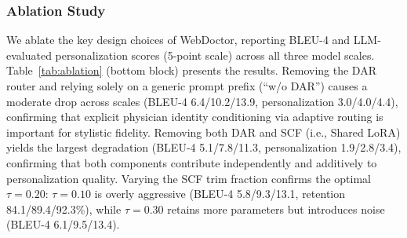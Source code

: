 \subsubsection*{Ablation Study}
We ablate the key design choices of WebDoctor, reporting BLEU-4 and LLM-evaluated personalization scores (5-point scale) across all three model scales.
Table~\ref{tab:ablation} (bottom block) presents the results.
Removing the DAR router and relying solely on a generic prompt prefix (``w/o DAR'') causes a moderate drop across scales (BLEU-4 6.4/10.2/13.9, personalization 3.0/4.0/4.4), confirming that explicit physician identity conditioning via adaptive routing is important for stylistic fidelity.
Removing both DAR and SCF (i.e., Shared LoRA) yields the largest degradation (BLEU-4 5.1/7.8/11.3, personalization 1.9/2.8/3.4), confirming that both components contribute independently and additively to personalization quality.
Varying the SCF trim fraction confirms the optimal $\tau=0.20$: $\tau=0.10$ is overly aggressive (BLEU-4 5.8/9.3/13.1, retention 84.1/89.4/92.3\%), while $\tau=0.30$ retains more parameters but introduces noise (BLEU-4 6.1/9.5/13.4).





